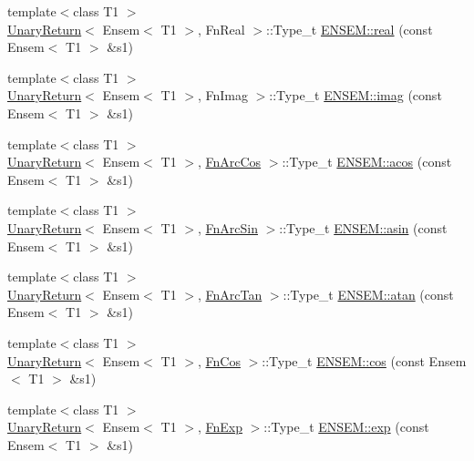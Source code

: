 \begin{DoxyCompactItemize}
\item 
{\footnotesize template$<$class T1 $>$ }\\\mbox{\hyperlink{structUnaryReturn}{Unary\+Return}}$<$ Ensem$<$ T1 $>$, Fn\+Real $>$\+::Type\+\_\+t \mbox{\hyperlink{group__eensem_ga633b11ccc18bea07f60b3c9589dafe58}{E\+N\+S\+E\+M\+::real}} (const Ensem$<$ T1 $>$ \&s1)
\item 
{\footnotesize template$<$class T1 $>$ }\\\mbox{\hyperlink{structUnaryReturn}{Unary\+Return}}$<$ Ensem$<$ T1 $>$, Fn\+Imag $>$\+::Type\+\_\+t \mbox{\hyperlink{group__eensem_gab3382717c5ea66ead42fa648ad4cefbc}{E\+N\+S\+E\+M\+::imag}} (const Ensem$<$ T1 $>$ \&s1)
\item 
{\footnotesize template$<$class T1 $>$ }\\\mbox{\hyperlink{structUnaryReturn}{Unary\+Return}}$<$ Ensem$<$ T1 $>$, \mbox{\hyperlink{structFnArcCos}{Fn\+Arc\+Cos}} $>$\+::Type\+\_\+t \mbox{\hyperlink{group__eensem_ga31bcbfa79251bff0ce60e7d8fb2b8ff3}{E\+N\+S\+E\+M\+::acos}} (const Ensem$<$ T1 $>$ \&s1)
\item 
{\footnotesize template$<$class T1 $>$ }\\\mbox{\hyperlink{structUnaryReturn}{Unary\+Return}}$<$ Ensem$<$ T1 $>$, \mbox{\hyperlink{structFnArcSin}{Fn\+Arc\+Sin}} $>$\+::Type\+\_\+t \mbox{\hyperlink{group__eensem_gada63412fd27e80930e9d85703ba2394b}{E\+N\+S\+E\+M\+::asin}} (const Ensem$<$ T1 $>$ \&s1)
\item 
{\footnotesize template$<$class T1 $>$ }\\\mbox{\hyperlink{structUnaryReturn}{Unary\+Return}}$<$ Ensem$<$ T1 $>$, \mbox{\hyperlink{structFnArcTan}{Fn\+Arc\+Tan}} $>$\+::Type\+\_\+t \mbox{\hyperlink{group__eensem_gaa9d40be37b4214b6c8f1e94f6a52dea3}{E\+N\+S\+E\+M\+::atan}} (const Ensem$<$ T1 $>$ \&s1)
\item 
{\footnotesize template$<$class T1 $>$ }\\\mbox{\hyperlink{structUnaryReturn}{Unary\+Return}}$<$ Ensem$<$ T1 $>$, \mbox{\hyperlink{structFnCos}{Fn\+Cos}} $>$\+::Type\+\_\+t \mbox{\hyperlink{group__eensem_gac1023736758024ac0b3d64cf9021b716}{E\+N\+S\+E\+M\+::cos}} (const Ensem$<$ T1 $>$ \&s1)
\item 
{\footnotesize template$<$class T1 $>$ }\\\mbox{\hyperlink{structUnaryReturn}{Unary\+Return}}$<$ Ensem$<$ T1 $>$, \mbox{\hyperlink{structFnExp}{Fn\+Exp}} $>$\+::Type\+\_\+t \mbox{\hyperlink{group__eensem_ga98866485949365e5677de99a9cbe2a93}{E\+N\+S\+E\+M\+::exp}} (const Ensem$<$ T1 $>$ \&s1)

\end{DoxyCompactItemize}
